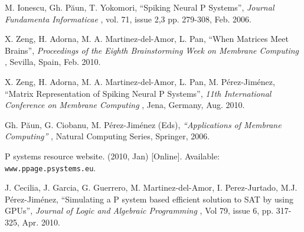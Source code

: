 \documentclass{acm_proc_article-sp}
\begin{document}


%
%

\begin{thebibliography}{9999}



 M. Ionescu, Gh. P\u aun, T. Yokomori, ``Spiking Neural P Systems'', {\it Journal Fundamenta Informaticae  }, vol. 71, issue 2,3 pp. 279-308, Feb. 2006.

 X. Zeng, H. Adorna, M. A. Martinez-del-Amor, L. Pan, ``When Matrices Meet Brains'', {\it Proceedings of the Eighth Brainstorming Week on Membrane Computing }, Sevilla, Spain, Feb. 2010.

 X. Zeng, H. Adorna, M. A. Martinez-del-Amor, L. Pan, M. P\'{e}rez-Jim\'{e}nez, ``Matrix Representation of Spiking Neural P Systems'', {\it 11th International Conference on Membrane Computing }, Jena, Germany, Aug. 2010.


 Gh. P\u aun, G. Ciobanu, M. P\'{e}rez-Jim\'{e}nez (Eds), {\it ``Applications of Membrane Computing'' }, Natural Computing Series, Springer, 2006.

 P systems resource website. (2010, Jan) [Online]. Available: {\tt www.ppage.psystems.eu}.

 J. Cecilia, J. Garcia, G. Guerrero, M. Martinez-del-Amor, I. Perez-Jurtado, M.J. P\'{e}rez-Jim\'{e}nez, ``Simulating a P system based efficient solution to SAT by using GPUs'', {\it Journal of Logic and Algebraic Programming }, Vol 79, issue 6, pp. 317-325, Apr. 2010.


\end{thebibliography}
\end{document}
